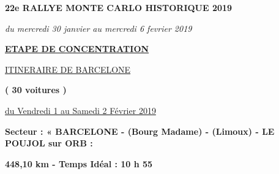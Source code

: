 \documentclass{article}%
\begin{document}
%
\normalsize%
\begin{center} \textbf{\LARGE{22e RALLYE MONTE CARLO HISTORIQUE 2019}} \end{center}%
\begin{flushleft} \textit{du mercredi 30 janvier au mercredi 6 fevrier 2019} \end{flushleft}%
\begin{center} \textbf{\underline{ETAPE DE CONCENTRATION}} \end{center}%
\begin{center} \underline{ITINERAIRE DE BARCELONE} \end{center}%
\begin{center} \textbf{( 30 voitures )} \end{center}%
\begin{flushright} \underline{du Vendredi 1 au Samedi 2 Février 2019} \end{flushright}%
\begin{flushleft} \textbf{Secteur : « BARCELONE - (Bourg Madame) - (Limoux) - LE POUJOL sur ORB  :
} \end{flushleft}%
\begin{flushright} \textbf{448,10 km - Temps Idéal : 10 h 55} \end{flushright}%
\end{document}
